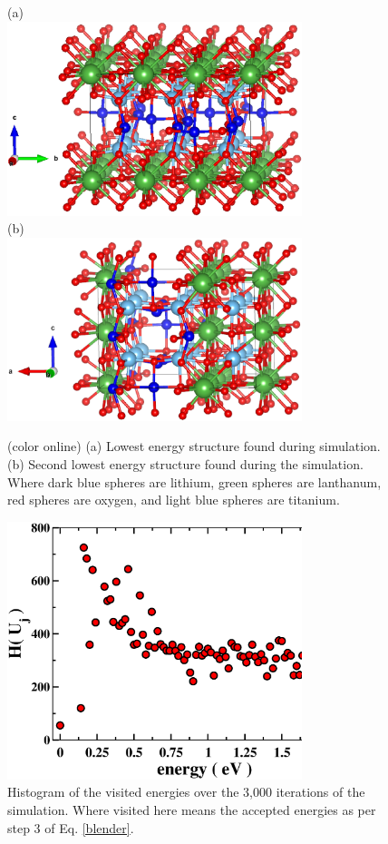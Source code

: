 \documentclass[aps,pre,reprint,superscriptaddress,showkeys]{revtex4-1}
\begin{document}
\begin{figure}
(a)\\
\includegraphics[width=8.6cm]{fig10a.eps}\\
(b)\\
\includegraphics[width=8.6cm]{fig10b.eps}
\caption{(color online) (a) Lowest energy structure found during simulation. (b) Second lowest energy structure found during the simulation. Where dark blue spheres are lithium, green spheres are lanthanum, red spheres are oxygen, and light blue spheres  are titanium. \label{lowen_structures}}
\end{figure}

\begin{figure}
\includegraphics[width=8.6cm]{fig11.eps}
\caption{Histogram of the visited energies over the 3,000 iterations of the simulation. Where visited here means the accepted energies as per step 3 of Eq. \ref{blender}.\label{Htot}}
\end{figure}
\end{document}
